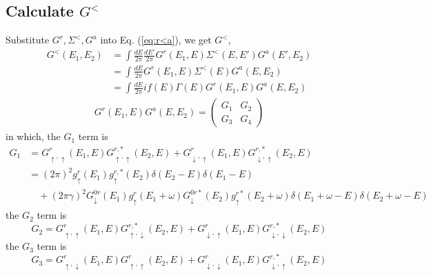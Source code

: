 \documentclass[11pt,a4paper]{article}
\begin{document}
\subsection{Calculate $G^{<}$}
Substitute $G^{r}, \Sigma^{<}, G^{a}$ into Eq. (\ref{eq:r<a}), we get $G^{<}$,
\begin{equation}
\begin{split}
G^{<}(E_{1},E_{2})&=\int\frac{dE}{2\pi}\frac{dE'}{2\pi}G^{r}(E_{1}, E) \Sigma^{<}(E, E') G^{a}(E', E_{2}) \\
&= \int \frac{dE}{2\pi} G^{r}\left(E_{1}, E\right) \Sigma^{<}\left(E\right) G^{a}\left(E, E_{2}\right) \\
&= \int \frac{dE}{2\pi} if(E)\Gamma(E) G^{r}\left(E_{1}, E\right) G^{a}\left(E, E_{2}\right)
\end{split}
\end{equation}
\begin{equation}
\begin{split}
G^{r}\left(E_{1}, E\right) G^{a}\left(E, E_{2}\right) =
\left(\begin{array}{cc}
G_{1} & G_{2} \\
G_{3} & G_{4}
\end{array}\right)
\end{split}
\end{equation}
in which, the $G_{1}$ term is
\begin{equation}
\begin{split}
G_{1} &= G_{\uparrow, \uparrow}^{r}(E_{1}, E)G_{\uparrow, \uparrow}^{r,*}(E_{2},E)+G_{\downarrow, \uparrow}^{r}(E_{1},E)G_{\downarrow, \uparrow}^{r,*}(E_{2},E) \\
&= (2 \pi)^{2} g_{\uparrow}^{r}\left(E_{1}\right)  g_{\uparrow}^{r,*}\left(E_{2}\right) \delta\left(E_{2}-E\right) \delta\left(E_{1}-E\right) \\
&\quad + (2 \pi \gamma)^{2} G_{\downarrow}^{0 r}\left(E_{1}\right) g_{\uparrow}^{r}\left(E_{1}+\omega\right)  G_{\downarrow}^{0 r*}\left(E_{2}\right) g_{\uparrow}^{r*}\left(E_{2}+\omega\right) \delta\left(E_{1}+\omega-E\right) \delta\left(E_{2}+\omega-E\right)
\end{split}
\end{equation}
the $G_{2}$ term is
\begin{equation}
G_{2} = G_{\uparrow, \uparrow}^{r}(E_{1}, E)G_{\uparrow, \downarrow}^{r,*}(E_{2},E) + G_{\downarrow, \uparrow}^{r}(E_{1}, E)G_{\downarrow, \downarrow}^{r,*}(E_{2},E)
\end{equation}
the $G_{3}$ term is
\begin{equation}
G_{3} = G_{\uparrow, \downarrow}^{r}(E_{1},E)G_{\uparrow, \uparrow}^{r}(E_{2},E) + G_{\downarrow, \downarrow}^{r}(E_{1},E)G_{\downarrow, \uparrow}^{r,*}(E_{2},E)
\end{equation}
\end{document}
